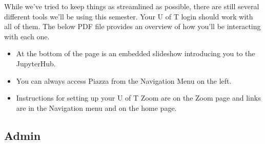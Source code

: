 \documentclass[
  openany]{book}
\providecommand{\tightlist}{%
  \setlength{\itemsep}{0pt}\setlength{\parskip}{0pt}}
\begin{document}
While we've tried to keep things as streamlined as possible, there are still several different tools we'll be using this semester. Your U of T login should work with all of them. The below PDF file provides an overview of how you'll be interacting with each one.

\begin{itemize}
\tightlist
\item
  At the bottom of the page is an embedded slideshow introducing you to the JupyterHub.\\
\item
  You can always access Piazza from the Navigation Menu on the left.\\
\item
  Instructions for setting up your U of T Zoom are on the Zoom page and links are in the Navigation menu and on the home page.
\end{itemize}

\hypertarget{admin}{%
\subsection{Admin}\label{admin}}
\end{document}
